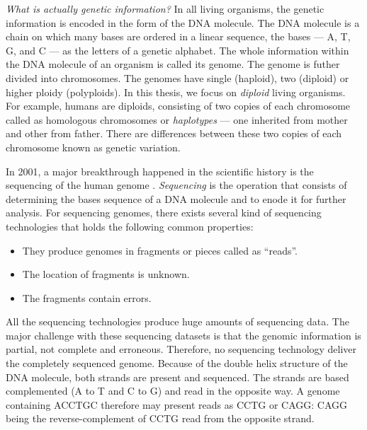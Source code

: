 \textit{What is actually genetic information?} In all living organisms, the genetic information is encoded in the form of the DNA molecule.
The DNA molecule is a chain on which many bases are ordered in a linear sequence, the bases --- A, T, G, and C --- as the letters of a genetic alphabet.
The whole information within the DNA molecule of an organism is called its genome. The genome is futher divided into chromosomes.
The genomes have single (haploid), two (diploid) or higher ploidy (polyploids). 
In this thesis, we focus on \textit{diploid} living organisms. For example, humans are diploids, consisting of two copies of each chromosome called as homologous chromosomes or \textit{haplotypes} --- one inherited from mother and other from father.
There are differences between these two copies of each chromosome known as genetic variation. 

In 2001, a major breakthrough happened in the scientific history is the sequencing of the human genome \citep{collins2003human}.
\textit{Sequencing} is the operation that consists of determining the bases sequence of a DNA molecule and to enode it for further analysis.
For sequencing genomes, there exists several kind of sequencing technologies that holds the following common properties:
\begin{itemize}
 \item They produce genomes in fragments or pieces called as ``reads''.
 \item The location of fragments is unknown.
 \item The fragments contain errors.
\end{itemize}

All the sequencing technologies produce huge amounts of sequencing data. 
The major challenge with these sequencing datasets is that the genomic information is partial, not complete and erroneous. Therefore, no sequencing technology deliver the completely sequenced genome.
Because of the double helix structure of the DNA molecule, both strands are present and sequenced. 
The strands are based complemented (A to T and C to G) and read in the opposite way.
A genome containing ACCTGC therefore may present reads as CCTG or CAGG: CAGG being the reverse-complement of CCTG read from the opposite strand.

